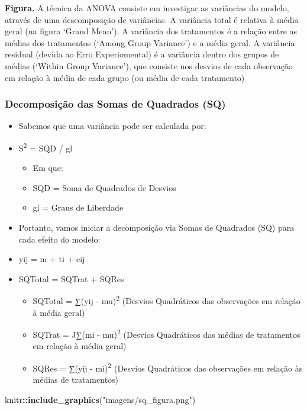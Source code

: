 \documentclass[
]{book}
\newenvironment{Shaded}{\begin{snugshade}}{\end{snugshade}}
\newcommand{\FunctionTok}[1]{\textcolor[rgb]{0.13,0.29,0.53}{\textbf{#1}}}
\newcommand{\NormalTok}[1]{#1}
\newcommand{\SpecialCharTok}[1]{\textcolor[rgb]{0.81,0.36,0.00}{\textbf{#1}}}
\newcommand{\StringTok}[1]{\textcolor[rgb]{0.31,0.60,0.02}{#1}}
\providecommand{\tightlist}{%
  \setlength{\itemsep}{0pt}\setlength{\parskip}{0pt}}
\begin{document}
\textbf{Figura.} A técnica da ANOVA consiste em investigar as variâncias do modelo, através de uma descomposição de variâncias. A variância total é relativa à média geral (na figura `Grand Mean'). A variância dos tratamentos é a relação entre as médias dos tratamentos (`Among Group Variance') e a média geral. A variância residual (devida ao Erro Experiomental) é a variância dentro dos grupos de médias (`Within Group Variance'), que consiste nos desvios de cada observação em relação à média de cada grupo (ou média de cada tratamento)

\subsubsection{Decomposição das Somas de Quadrados (SQ)}\label{decomposiuxe7uxe3o-das-somas-de-quadrados-sq}

\begin{itemize}
\item
  Sabemos que uma variância pode ser calculada por:
\item
  S\textsuperscript{2} = SQD / gl

  \begin{itemize}
  \tightlist
  \item
    Em que:
  \item
    SQD = Soma de Quadrados de Desvios
  \item
    gl = Graus de Liberdade
  \end{itemize}
\item
  Portanto, vamos iniciar a decomposição via Somas de Quadrados (SQ) para cada efeito do modelo:
\item
  yij = m + ti + eij
\item
  SQTotal = SQTrat + SQRes

  \begin{itemize}
  \tightlist
  \item
    SQTotal = ∑(yij - mu)\textsuperscript{2} (Desvios Quadráticos das observações em relação à média geral)
  \item
    SQTrat = J∑(mi - mu)\textsuperscript{2} (Desvios Quadráticos das médias de tratamentos em relação à média geral)
  \item
    SQRes = ∑(yij - mi)\textsuperscript{2} (Desvios Quadráticos das observações em relação às médias de tratamentos)
  \end{itemize}
\end{itemize}

\begin{Shaded}
\begin{Highlighting}[]
\NormalTok{knitr}\SpecialCharTok{::}\FunctionTok{include\_graphics}\NormalTok{(}\StringTok{"imagens/sq\_figura.png"}\NormalTok{)}
\end{Highlighting}
\end{Shaded}
\end{document}

